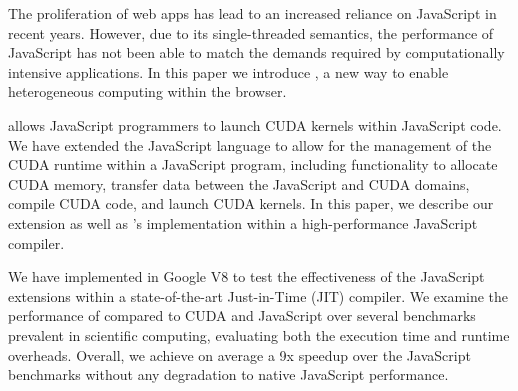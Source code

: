 
The proliferation of web apps has lead to an increased reliance on JavaScript in
recent years. However, due to its single-threaded semantics, the performance of
JavaScript has not been able to match the demands required by computationally
intensive applications. In this paper we introduce \namens, a new way to enable
heterogeneous computing within the browser.

\name allows JavaScript programmers to launch CUDA kernels within JavaScript
code. We have extended the JavaScript language to allow for the management of
the CUDA runtime within a JavaScript program, including functionality to
allocate CUDA memory, transfer data between the JavaScript and CUDA domains,
compile CUDA code, and launch CUDA kernels. In this paper, we describe our
extension as well as \namens's implementation within a high-performance
JavaScript compiler.

We have implemented \name in Google V8 to test the
effectiveness of the JavaScript extensions within a state-of-the-art
Just-in-Time (JIT) compiler. We examine the performance of \name compared to
CUDA and JavaScript over several benchmarks prevalent in scientific computing,
evaluating both the execution time and runtime overheads.  Overall, we achieve
on average a 9x speedup over the JavaScript benchmarks without any degradation
to native JavaScript performance.

